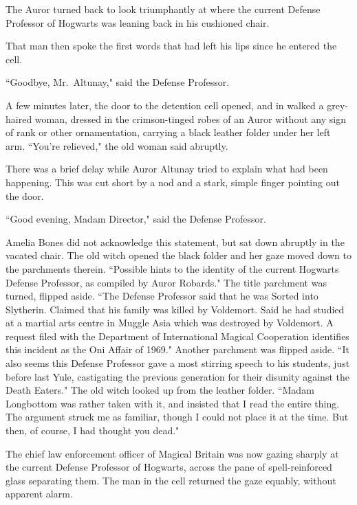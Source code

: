 The Auror turned back to look triumphantly at where the current Defense Professor of Hogwarts was leaning back in his cushioned chair.

That man then spoke the first words that had left his lips since he entered the cell.

``Goodbye, Mr.~Altunay," said the Defense Professor.

A few minutes later, the door to the detention cell opened, and in walked a grey-haired woman, dressed in the crimson-tinged robes of an Auror without any sign of rank or other ornamentation, carrying a black leather folder under her left arm. ``You're relieved," the old woman said abruptly.

There was a brief delay while Auror Altunay tried to explain what had been happening. This was cut short by a nod and a stark, simple finger pointing out the door.

``Good evening, Madam Director," said the Defense Professor.

Amelia Bones did not acknowledge this statement, but sat down abruptly in the vacated chair. The old witch opened the black folder and her gaze moved down to the parchments therein. ``Possible hints to the identity of the current Hogwarts Defense Professor, as compiled by Auror Robards." The title parchment was turned, flipped aside. ``The Defense Professor said that he was Sorted into Slytherin. Claimed that his family was killed by Voldemort. Said he had studied at a martial arts centre in Muggle Asia which was destroyed by Voldemort. A request filed with the Department of International Magical Cooperation identifies this incident as the Oni Affair of 1969." Another parchment was flipped aside. ``It also seems this Defense Professor gave a most stirring speech to his students, just before last Yule, castigating the previous generation for their disunity against the Death Eaters." The old witch looked up from the leather folder. ``Madam Longbottom was rather taken with it, and insisted that I read the entire thing. The argument struck me as familiar, though I could not place it at the time. But then, of course, I had thought you dead."

The chief law enforcement officer of Magical Britain was now gazing sharply at the current Defense Professor of Hogwarts, across the pane of spell-reinforced glass separating them. The man in the cell returned the gaze equably, without apparent alarm.

